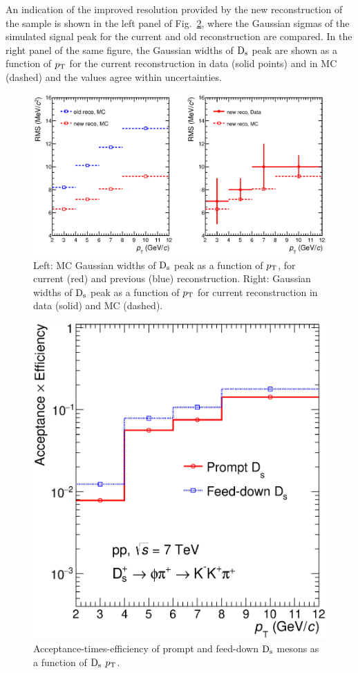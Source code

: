An indication of the improved resolution provided by the new 
reconstruction of the sample is shown in the left panel of Fig.~\ref{fig:sigma4vs2}, where the 
Gaussian sigmas of the simulated signal peak for the current and old
reconstruction are compared. In the right
panel of the same figure, the Gaussian widths of ${\rm D_s}$ peak are shown 
as a function of $p_{\rm T}$ for the current reconstruction in data (solid points)
and in MC (dashed) and the values agree within uncertainties. 
\begin{figure}[!hb]
\begin{center}
\includegraphics[width=.9\textwidth]{FigCap4/Resolutions_pass2_pass4.eps}
\caption{Left: MC Gaussian widths of ${\rm D_s}$ peak as a function of $p_{\rm T}$, for current (red) and previous (blue) reconstruction. Right: Gaussian widths of ${\rm D_s}$ peak as a function of $p_{\rm T}$ for current reconstruction in data (solid) and MC (dashed). }
\label{fig:sigma4vs2}
\end{center}
\end{figure}

\begin{figure}[!hb]
\begin{center}
\includegraphics[width=.52\textwidth]{FigCap4/AccEff_Ds_Pass4.eps}
\caption{Acceptance-times-efficiency of prompt and feed-down ${\rm D_s}$ mesons as a function of ${\rm D_s}$ $p_{\rm T}$.}
\label{fig:sigma4vs2}
\end{center}
\end{figure}

